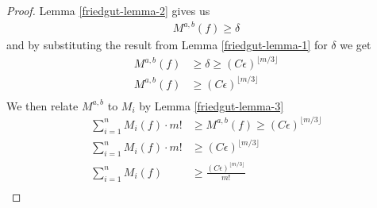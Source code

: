 	\begin{proof}
		Lemma \ref{friedgut-lemma-2} gives us
		\begin{align*}
			M^{a,b}(f) \ge \delta
		\end{align*}
		and by substituting the result from Lemma \ref{friedgut-lemma-1} for $\delta$ we get
		\begin{align*}
			M^{a,b}(f) &\ge \delta \ge (C\epsilon)^{\lfloor m/3 \rfloor} \\
			M^{a,b}(f) &\ge (C\epsilon)^{\lfloor m/3 \rfloor} \\
		\end{align*}
		We then relate $M^{a,b}$ to $M_i$ by Lemma \ref{friedgut-lemma-3}
		\begin{align*}
			\sum^n_{i=1} M_i(f) \cdot m! &\ge M^{a,b}(f) \ge (C\epsilon)^{\lfloor m/3 \rfloor} \\
			\sum^n_{i=1} M_i(f) \cdot m! &\ge (C\epsilon)^{\lfloor m/3 \rfloor} \\
			\sum^n_{i=1} M_i(f) &\ge \frac{(C\epsilon)^{\lfloor m/3 \rfloor}}{m!} \\
		\end{align*}
	\end{proof}
